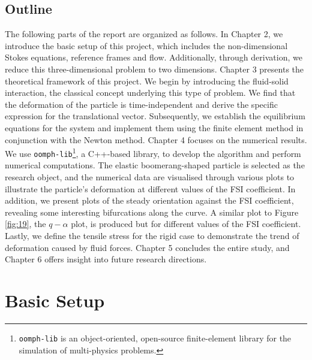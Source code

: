 \documentclass[12pt,MSc,twoside]{muthesis_2020}
\begin{document}
\section{Outline}
The following parts of the report are organized as follows.
In Chapter 2, we introduce the basic setup of this project, which includes the non-dimensional Stokes equations, reference frames and flow. Additionally, through derivation, we reduce this three-dimensional problem to two dimensions. Chapter 3 presents the theoretical framework of this project. We begin by introducing the fluid-solid interaction, the classical concept underlying this type of problem. We find that the deformation of the particle is time-independent and derive the specific expression for the translational vector. Subsequently, we establish the equilibrium equations for the system and implement them using the finite element method in conjunction with the Newton method. Chapter 4 focuses on the numerical results. We use \texttt{oomph-lib}\footnote{\texttt{oomph-lib} is an object-oriented, open-source finite-element library for the simulation of multi-physics problems.}, a C++-based library, to develop the algorithm and perform numerical computations. The elastic boomerang-shaped particle is selected as the research object, and the numerical data are visualised through various plots to illustrate the particle's deformation at different values of the FSI coefficient. In addition, we present plots of the steady orientation against the FSI coefficient, revealing some interesting bifurcations along the curve. A similar plot to Figure \ref{fig:19}, the $q-\alpha$ plot, is produced but for different values of the FSI coefficient. Lastly, we define the tensile stress for the rigid case to demonstrate the trend of deformation caused by fluid forces. Chapter 5 concludes the entire study, and Chapter 6 offers insight into future research directions.


\chapter{Basic Setup}
\end{document}
